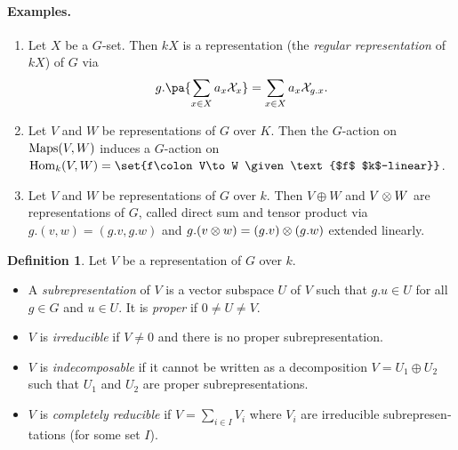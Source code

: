 \documentclass[12pt,a4paper]{scrartcl}
\theoremstyle{cplain}
\theoremstyle{cplain}
\theoremstyle{cplain}
\theoremstyle{definition}
\newtheorem*{deff}{Definition}
\begin{document}
\begin{otherlanguage}{english}
\paragraph{Examples.}
\begin{enumerate}
  \item Let $X$ be a $G$-set. Then $kX$ is a representation (the \emph{regular representation} of $kX$) of $G$ via \[ g.\pa{\sum_{x\in X} a_x \Xs_x} = \sum_{x \in X} a_x \Xs_{g.x}. \]
  \item Let $V$ and $W$ be representations of $G$ over $K$. Then the $G$-action on $\operatorname{Maps}(V,W)$ induces a $G$-action on $\Hom_k(V,W) = \set{f\colon V\to W \given \text{$f$ $k$-linear}}$.
  \item Let $V$ and $W$ be representations of $G$ over $k$. Then $V \oplus W$ and $V\otimes W$ are representations of $G$, called direct sum and tensor product via $g.(v,w) = (g.v,g.w)$ and $g.(v\otimes w) = (g.v)\otimes (g.w)$ extended linearly.
\end{enumerate}

\begin{deff}
  Let $V$ be a representation of $G$ over $k$.
  \begin{itemize}
    \item A \emph{subrepresentation} of $V$ is a vector subspace $U$ of $V$ such that $g.u \in U$ for all $g \in G$ and $u \in U$. It is \emph{proper} if $0 \neq U \neq V$.
    \item $V$ is \emph{irreducible} if $V\neq 0$ and there is no proper subrepresentation.
    \item $V$ is \emph{indecomposable} if it cannot be written as a decomposition $V=U_1 \oplus U_2$ such that $U_1$ and $U_2$ are proper subrepresentations.
    \item $V$ is \emph{completely reducible} if $V = \sum_{i \in I} V_i$ where $V_i$ are irreducible subrepresentations (for some set $I$).
  \end{itemize}
\end{deff}


\end{otherlanguage}
\end{document}
